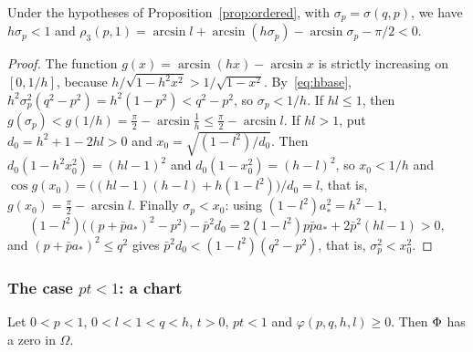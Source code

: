 \begin{lemma}\label{lem:topleft}
Under the hypotheses of Proposition~\ref{prop:ordered}, with
$\sigma_p=\sigma(q,p)$, we have $h\sigma_p<1$ and
$\rho_3(p,1)=\arcsin l+\arcsin(h\sigma_p)-\arcsin\sigma_p-\pi/2<0$.
\end{lemma}

\begin{proof}
The function $g(x)=\arcsin(hx)-\arcsin x$ is strictly increasing on
$[0,1/h]$, because $h/\sqrt{1-h^2x^2}>1/\sqrt{1-x^2}$. By~\eqref{eq:hbase},
$h^2\sigma_p^2(q^2-p^2)=h^2(1-p^2)<q^2-p^2$, so $\sigma_p<1/h$. If $hl\le1$,
then $g(\sigma_p)<g(1/h)=\frac\pi2-\arcsin\frac1h\le\frac\pi2-\arcsin l$. If
$hl>1$, put $d_0=h^2+1-2hl>0$ and $x_0=\sqrt{(1-l^2)/d_0}$. Then
$d_0(1-h^2x_0^2)=(hl-1)^2$ and $d_0(1-x_0^2)=(h-l)^2$, so $x_0<1/h$ and
$\cos g(x_0)=\bigl((hl-1)(h-l)+h(1-l^2)\bigr)/d_0=l$, that is,
$g(x_0)=\frac\pi2-\arcsin l$. Finally $\sigma_p<x_0$: using
$(1-l^2)a_*^2=h^2-1$,
\[
  (1-l^2)\bigl((p+\bar pa_*)^2-p^2\bigr)-\bar p^2d_0=2(1-l^2)p\bar pa_*+2\bar p^2(hl-1)>0,
\]
and $(p+\bar pa_*)^2\le q^2$ gives $\bar p^2d_0<(1-l^2)(q^2-p^2)$, that is,
$\sigma_p^2<x_0^2$.
\end{proof}

\subsubsection*{The case $pt<1$: a chart}

\begin{proposition}\label{prop:chart}
Let $0<p<1$, $0<l<1<q<h$, $t>0$, $pt<1$ and $\varphi(p,q,h,l)\ge0$. Then
$\Phi$ has a zero in $\Omega$.
\end{proposition}

